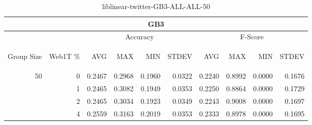 \begin{center}
\begin{table}[htbp]
\begin{tabular}{ | r | r | r | r | r | r | r | r | r | r |}
\hline
\multicolumn{10}{|c|}{GB3}\\
\hline
 & & \multicolumn{4}{|c|}{Accuracy} & \multicolumn{4}{|c|}{F-Score}\\ \cline{3-10}
\begin{sideways}Group Size\end{sideways} & \begin{sideways}Web1T \%\end{sideways} & \begin{sideways}AVG\end{sideways} & \begin{sideways}MAX\end{sideways} & \begin{sideways}MIN\end{sideways} & \begin{sideways}STDEV\end{sideways} & \begin{sideways}AVG\end{sideways} & \begin{sideways}MAX\end{sideways} & \begin{sideways}MIN\end{sideways} & \begin{sideways}STDEV\end{sideways}\\
\hline
\multirow{4}{*}{50}
 & 0 & 0.2467 & 0.2968 & 0.1960 & 0.0322 & 0.2240 & 0.8992 & 0.0000 & 0.1676\\ \cline{2-10}
 & 1 & 0.2465 & 0.3082 & 0.1949 & 0.0353 & 0.2250 & 0.8864 & 0.0000 & 0.1729\\ \cline{2-10}
 & 2 & 0.2465 & 0.3034 & 0.1923 & 0.0349 & 0.2243 & 0.9008 & 0.0000 & 0.1697\\ \cline{2-10}
 & 4 & 0.2559 & 0.3163 & 0.2019 & 0.0353 & 0.2333 & 0.8978 & 0.0000 & 0.1695\\ \cline{2-10}
\hline
\end{tabular}
\caption{liblinear-twitter-GB3-ALL-ALL-50}
\end{table}
\end{center}

